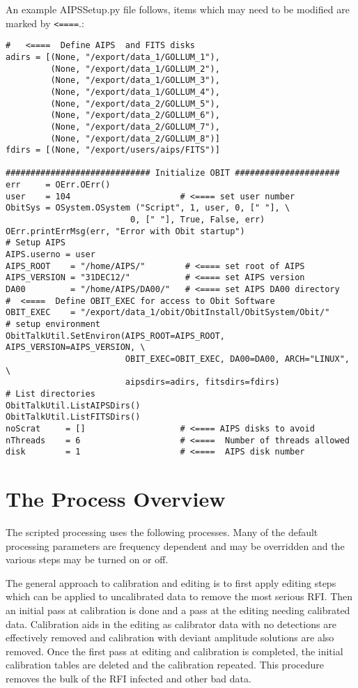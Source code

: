 \documentclass[11pt]{article}
\begin{document}
An example AIPSSetup.py file follows, items which may need to be
modified are marked by {\tt <====}.:
\begin{verbatim}
#   <====  Define AIPS  and FITS disks
adirs = [(None, "/export/data_1/GOLLUM_1"),
         (None, "/export/data_1/GOLLUM_2"),
         (None, "/export/data_1/GOLLUM_3"),
         (None, "/export/data_1/GOLLUM_4"),
         (None, "/export/data_2/GOLLUM_5"),
         (None, "/export/data_2/GOLLUM_6"),
         (None, "/export/data_2/GOLLUM_7"),
         (None, "/export/data_2/GOLLUM_8")]
fdirs = [(None, "/export/users/aips/FITS")]

############################# Initialize OBIT #####################
err     = OErr.OErr()
user    = 104                      # <==== set user number
ObitSys = OSystem.OSystem ("Script", 1, user, 0, [" "], \
                         0, [" "], True, False, err)
OErr.printErrMsg(err, "Error with Obit startup")
# Setup AIPS
AIPS.userno = user
AIPS_ROOT    = "/home/AIPS/"        # <==== set root of AIPS
AIPS_VERSION = "31DEC12/"           # <==== set AIPS version
DA00         = "/home/AIPS/DA00/"   # <==== set AIPS DA00 directory
#  <====  Define OBIT_EXEC for access to Obit Software 
OBIT_EXEC    = "/export/data_1/obit/ObitInstall/ObitSystem/Obit/"
# setup environment
ObitTalkUtil.SetEnviron(AIPS_ROOT=AIPS_ROOT, AIPS_VERSION=AIPS_VERSION, \
                        OBIT_EXEC=OBIT_EXEC, DA00=DA00, ARCH="LINUX", \
                        aipsdirs=adirs, fitsdirs=fdirs)
# List directories
ObitTalkUtil.ListAIPSDirs()
ObitTalkUtil.ListFITSDirs()
noScrat     = []                   # <==== AIPS disks to avoid 
nThreads    = 6                    # <====  Number of threads allowed
disk        = 1                    # <====  AIPS disk number
\end{verbatim}

\section{The Process Overview}

The scripted processing uses the following processes.
Many of the default processing parameters are frequency dependent and
may be overridden and the various steps may be turned on or off.

The general approach to calibration and editing is to first apply
editing steps which can be applied to uncalibrated data to remove the
most serious RFI.
Then an initial pass at calibration is done and a pass at the editing
needing calibrated data.
Calibration aids in the editing as calibrator data with no detections
are effectively removed and calibration with deviant amplitude
solutions are also removed.
Once the first pass at editing and calibration is completed, the
initial calibration tables are deleted and the calibration repeated.
This procedure removes the bulk of the RFI infected and other bad
data.
\end{document}
